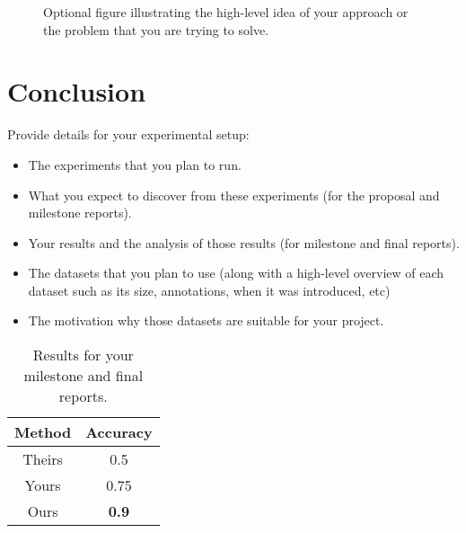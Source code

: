 \documentclass[10pt,twocolumn,letterpaper]{article}
\begin{document}
\begin{figure}[t]
\begin{center}
\fbox{\rule{0pt}{1.5in} \rule{0.7\linewidth}{0pt}}
\end{center}
   \caption{Optional figure illustrating the high-level idea of your approach or the problem that you are trying to solve.}
\label{fig:fig1}
\end{figure}

\section{Conclusion}

Provide details for your experimental setup:

\begin{itemize}
    \item The experiments that you plan to run.
    \item What you expect to discover from these experiments (for the proposal and milestone reports).
    \item Your results and the analysis of those results (for milestone and final reports).
    \item The datasets that you plan to use (along with a high-level overview of each dataset such as its size, annotations, when it was introduced, etc)
    \item The motivation why those datasets are suitable for your project.
\end{itemize}



\begin{table}
\begin{center}
\begin{tabular}{c c}
\hline
Method & Accuracy \\
\hline
Theirs & 0.5 \\
Yours & 0.75\\
Ours & \bf 0.9 \\
\hline
\end{tabular}
\end{center}
\caption{Results for your milestone and final reports.}
\end{table}




{\small


}
\end{document}
